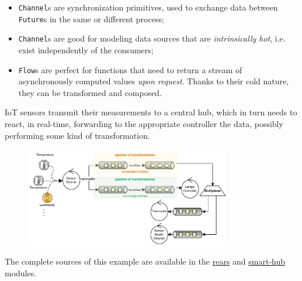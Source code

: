 \documentclass[aspectratio=1610,xcolor=dvipsnames]{beamer}
\begin{document}
\begin{frame}
  \begin{block}{}
      \begin{itemize}
          \item \texttt{Channel}s are synchronization primitives, used to exchange data between \texttt{Future}s in the same or different process;
          \item \texttt{Channel}s are good for modeling data sources that are \textit{intrinsically hot}, i.e. exist independently of the consumers;
          \item \texttt{Flow}s are perfect for functions that need to return a stream of asynchronously computed values \textit{upon request}. Thanks to their cold nature, they can be transformed and composed.
      \end{itemize}
  \end{block}
\end{frame}
%
\begin{frame}
  \begin{example}[3]
    IoT sensors transmit their measurements to a central hub, which in turn needs to react, in real-time, forwarding to the appropriate controller the data, possibly performing some kind of transformation.
    \begin{figure}
      \centering
      \includegraphics[width=0.8\textwidth]{./images/iot.pdf}
    \end{figure}
  \end{example}
  \footnotesize
  The complete sources of this example are available in the \href{https://github.com/tassiLuca/direct-style-experiments/tree/master/rears/src/main/scala/io/github/tassiLuca/rears}{rears} and \href{https://github.com/tassiLuca/direct-style-experiments/tree/master/smart-hub-direct}{smart-hub} modules.
\end{frame}
%
\end{document}
